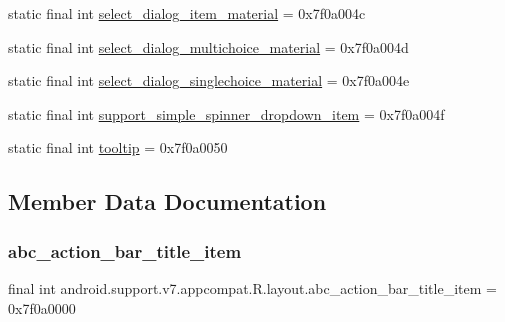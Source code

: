 \begin{DoxyCompactItemize}
\item 
static final int \mbox{\hyperlink{classandroid_1_1support_1_1v7_1_1appcompat_1_1R_1_1layout_ac19040d9099a5f9d5427814ac4a16e37}{select\+\_\+dialog\+\_\+item\+\_\+material}} = 0x7f0a004c
\item 
static final int \mbox{\hyperlink{classandroid_1_1support_1_1v7_1_1appcompat_1_1R_1_1layout_adaf8230a8b0f528256d97c8817a7ea3c}{select\+\_\+dialog\+\_\+multichoice\+\_\+material}} = 0x7f0a004d
\item 
static final int \mbox{\hyperlink{classandroid_1_1support_1_1v7_1_1appcompat_1_1R_1_1layout_a5310ca432c171907a158a12388549c4b}{select\+\_\+dialog\+\_\+singlechoice\+\_\+material}} = 0x7f0a004e
\item 
static final int \mbox{\hyperlink{classandroid_1_1support_1_1v7_1_1appcompat_1_1R_1_1layout_ad5f037f06366e908921922a2df0a8133}{support\+\_\+simple\+\_\+spinner\+\_\+dropdown\+\_\+item}} = 0x7f0a004f
\item 
static final int \mbox{\hyperlink{classandroid_1_1support_1_1v7_1_1appcompat_1_1R_1_1layout_a9b8611758f3e13416ae1d2143aa041b7}{tooltip}} = 0x7f0a0050
\end{DoxyCompactItemize}


\subsection{Member Data Documentation}
\mbox{\label{classandroid_1_1support_1_1v7_1_1appcompat_1_1R_1_1layout_aec65987e63e9073748bd15e578bfe898}} 
\subsubsection{\texorpdfstring{abc\+\_\+action\+\_\+bar\+\_\+title\+\_\+item}{abc\_action\_bar\_title\_item}}
{\footnotesize\ttfamily final int android.\+support.\+v7.\+appcompat.\+R.\+layout.\+abc\+\_\+action\+\_\+bar\+\_\+title\+\_\+item = 0x7f0a0000\hspace{0.3cm}{\ttfamily [static]}}

